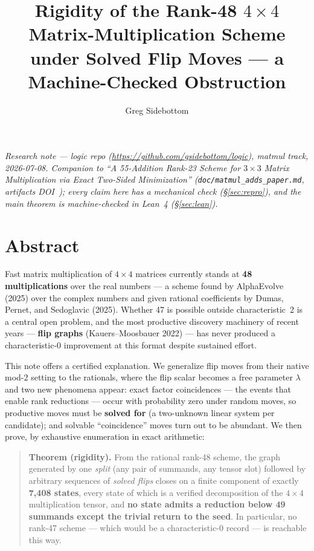 \documentclass[10pt]{article}
\title{\bfseries Rigidity of the Rank-48 $4\times4$ Matrix-Multiplication
  Scheme under Solved Flip Moves --- a Machine-Checked Obstruction}
\author{Greg Sidebottom}
\date{}
\begin{document}
\maketitle
\vspace{-3em}
\begin{center}
\itshape Research note --- logic repo
(\url{https://github.com/gsidebottom/logic}), matmul track, 2026-07-08.
Companion to ``A 55-Addition Rank-23 Scheme for $3\times3$ Matrix
Multiplication via Exact Two-Sided Minimization''
(\texttt{doc/matmul\_adds\_paper.md}, artifacts
DOI~); every claim here has a mechanical
check (\S\ref{sec:repro}), and the main theorem is machine-checked in
Lean~4 (\S\ref{sec:lean}).
\end{center}

\section*{Abstract}

Fast matrix multiplication of $4\times4$ matrices currently stands at
\textbf{48 multiplications} over the real numbers --- a scheme found by
AlphaEvolve (2025) over the complex numbers and given rational
coefficients by Dumas, Pernet, and Sedoglavic (2025). Whether 47 is
possible outside characteristic~2 is a central open problem, and the
most productive discovery machinery of recent years --- \textbf{flip
graphs} (Kauers--Moosbauer 2022) --- has never produced a
characteristic-0 improvement at this format despite sustained effort.

This note offers a certified explanation. We generalize flip moves
from their native mod-2 setting to the rationals, where the flip
scalar becomes a free parameter $\lambda$ and two new phenomena
appear: exact factor coincidences --- the events that enable rank
reductions --- occur with probability zero under random moves, so
productive moves must be \textbf{solved for} (a two-unknown linear
system per candidate); and solvable ``coincidence'' moves turn out to
be abundant. We then prove, by exhaustive enumeration in exact
arithmetic:

\begin{quote}
\textbf{Theorem (rigidity).} From the rational rank-48 scheme, the
graph generated by one \emph{split} (any pair of summands, any tensor
slot) followed by arbitrary sequences of \emph{solved flips} closes on
a finite component of exactly \textbf{7{,}408 states}, every state of
which is a verified decomposition of the $4\times4$ multiplication
tensor, and \textbf{no state admits a reduction below 49 summands
except the trivial return to the seed}. In particular, no rank-47
scheme --- which would be a characteristic-0 record --- is reachable
this way.
\end{quote}
\end{document}
